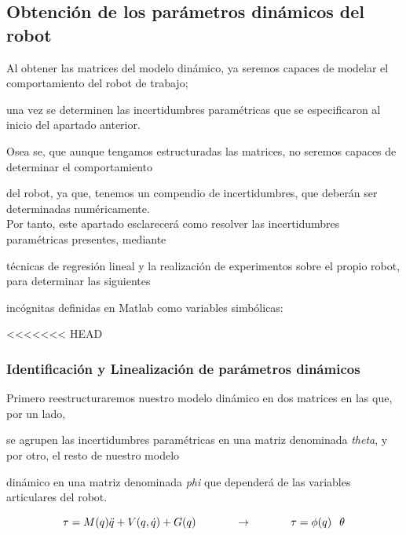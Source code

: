 \subsection{Obtención de los parámetros dinámicos del robot}

Al obtener las matrices del modelo dinámico, ya seremos capaces de modelar el comportamiento del robot de trabajo;

una vez se determinen las incertidumbres paramétricas que se especificaron al inicio del apartado anterior.

Osea se, que aunque tengamos estructuradas las matrices, no seremos capaces de determinar el comportamiento

del robot, ya que, tenemos un compendio de incertidumbres, que deberán ser determinadas numéricamente.\\



Por tanto, este apartado esclarecerá como resolver las incertidumbres paramétricas presentes, mediante

técnicas de regresión lineal y la realización de experimentos sobre el propio robot, para determinar las siguientes

incógnitas definidas en Matlab como variables simbólicas:

<<<<<<< HEAD


\subsubsection{Identificación y Linealización de parámetros dinámicos}

Primero reestructuraremos nuestro modelo dinámico en dos matrices en las que, por un lado,

se agrupen las incertidumbres paramétricas en una matriz denominada \textit{theta}, y por otro, el resto de nuestro modelo

dinámico en una matriz denominada \textit{phi} que dependerá de las variables articulares del robot.



\begin{equation}
\tau=M(q)\ddot{q}+V(q,\dot{q})+G(q) \hspace{1.25cm}  \rightarrow \hspace{1.25cm} \tau=\phi(q) \hspace{0.25cm} \theta
\end{equation}





